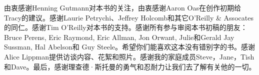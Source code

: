 \ifdefined\chs
由衷感谢Henning Gutmann对本书的关注，由衷感谢Aaron Oas在创作初期给Tracy的建议。感谢Laurie Petrychi、Jeffrey Holcomb和其它O'Reilly \& Assocates的同仁。感谢Tim O'Reilly对本书的支持。感谢所有参与审阅本书初稿的朋友：Bruce Perens, Eric Raymond, Eric Allman, Jon Orwant, Julie和Gerald Jay Sussman, Hal Abelson和 Guy Steele。希望你们能喜欢这本没有错别字的书。感谢Alice Lippman提供访谈内容、花絮和照片。感谢我的家庭成员Steve，Jane，Tish和Dave。最后，感谢理查德·斯托曼的勇气和忍耐力让我们去了解有关他的一切。
\fi

